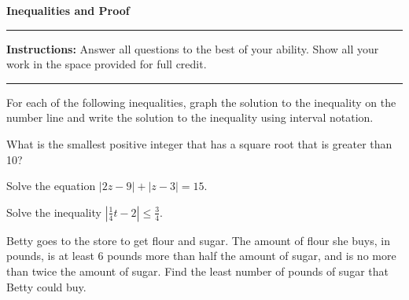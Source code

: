 \documentclass[12pt]{exam}
\newcommand{\examtitle}{Inequalities and Proof}
\newcommand{\instructions}{
    \noindent\rule{\textwidth}{0.5pt}
    \begin{center}
    \textbf{Instructions:} Answer all questions to the best of your ability. Show all your work in the space provided for full credit.
    \end{center}
    \noindent\rule{\textwidth}{0.5pt}
}
\begin{document}
\begin{center}
\textbf{\Large \examtitle} \\
\vspace{0.5cm}
\hspace{0.1\textwidth}
\end{center}

\instructions
\vspace{0.5cm}

\begin{questions}

\pointsinrightmargin
\question[15]
For each of the following inequalities, graph the solution to the inequality on the number line and write the solution to the inequality using interval notation.


\question[10]
What is the smallest positive integer that has a square root that is greater than 10?
\vspace*{4cm}

\question[10]
Solve the equation $|2z - 9| + |z - 3| = 15$.
\vspace*{6cm}

\question[10]
Solve the inequality $\left|\frac{1}{4}t - 2\right| \le \frac{3}{4}$.
\vspace*{5cm}

\newpage

\question[10]
Betty goes to the store to get flour and sugar. The amount of flour she buys, in pounds, is at least 6 pounds more than half the amount of sugar, and is no more than twice the amount of sugar. Find the least number of pounds of sugar that Betty could buy.
\vspace*{6cm}


\end{questions}
\end{document}
